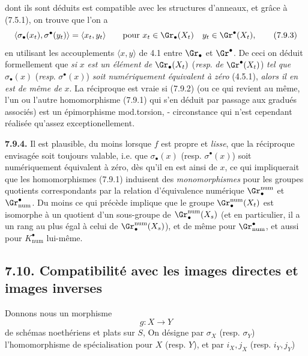 
dont ils sont déduits est compatible avec les structures d'anneaux, et grâce à (7.5.1), on trouve que l'on a
\[
  \langle\sigma_\bullet(x_t),\sigma^\bullet(y_t)\rangle
  =
  \langle x_t,y_t\rangle
  \qquad\text{pour }
  x_t\in\Gr_\bullet(X_t)\quad y_t\in\Gr^\bullet(X_t),
\tag{7.9.3}
\]
en utilisant les accouplements \(\langle x,y\rangle\) de 4.1 entre \(\Gr_\bullet\) et \(\Gr^\bullet\). De ceci on déduit formellement que \emph{si} \(x\) \emph{est un élément de} \(\Gr_\bullet(X_t)\) (\emph{resp}. \emph{de} \(\Gr^\bullet(X_t)\)) \emph{tel que} \(\sigma_\bullet(x)\) (\emph{resp}. \(\sigma^\bullet(x)\)) \emph{soit numériquement équivalent à zéro} (4.5.1), \emph{alors il en est de même de} \(x\). La réciproque est vraie si (7.9.2) (ou ce qui revient au même, l'un ou l'autre homomorphisme (7.9.1) qui s'en déduit par passage aux gradués associés) est un épimorphisme mod.torsion, - circonstance qui n'est cependant réalisée qu'assez exceptionellement.

\textbf{7.9.4.} Il est plausible, du moins lorsque \(f\) est propre et \emph{lisse}, que la réciproque envisagée soit toujours valable, i.e. que \(\sigma_\bullet(x)\) (resp. \(\sigma^\bullet(x)\)) soit numériquement équivalent à zéro, dès qu'il en est ainsi de \(x\), ce qui impliquerait que les homomorphismes (7.9.1) induisent des \emph{monomorphismes} pour les groupes quotients correspondants par la relation d'équivalence numérique \(\Gr^{\mathrm{num}}_\bullet\) et \(\Gr_{\mathrm{num}}^\bullet\). Du moins ce qui précède implique que le groupe \(\Gr_\bullet^{\mathrm{num}}(X_t)\) est isomorphe à un quotient d'un sous-groupe de \(\Gr_\bullet^{\mathrm{num}}(X_s)\) (et en particulier, il a un rang au plus égal à celui de \(\Gr_\bullet^{\mathrm{num}}(X_s)\)), et de même pour \(\Gr_{\mathrm{num}}^\bullet\), et aussi pour \(K^\bullet_{\mathrm{num}}\) lui-même.

\subsection*{7.10. Compatibilité avec les images directes et images inverses}
Donnons nous un morphisme
\[
  g:X\longrightarrow Y
\]
de schémas noethériens et plats sur \(S\), On désigne par \(\sigma_X\) (resp. \(\sigma_Y\)) l'homomorphisme de spécialisation pour \(X\) (resp. \(Y\)), et par \(i_X,j_X\) (resp. \(i_Y,j_Y\))
